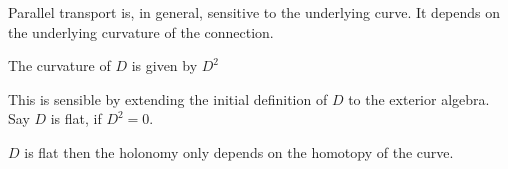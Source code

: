 Parallel transport is, in general, sensitive to the underlying curve. 
It depends on the underlying curvature of the connection. 

\begin{definition}
The curvature of $D$ is given by $D^2$ 
\end{definition}
This is sensible by extending the initial definition of $ D$ to the exterior algebra. 
Say $D$ is flat, if $ D^2 = 0 $. 

\begin{theorem}
    $D$ is flat then the holonomy only depends on the homotopy of the curve. 
\end{theorem}





 

